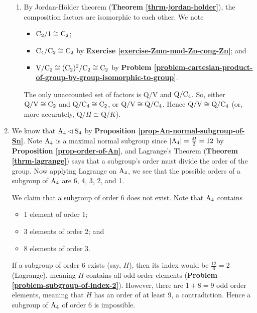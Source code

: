 \begin{enumerate}
\begin{enumerate}[label=(\roman*)]
        \item By Jordan-H\"older theorem (\textbf{Theorem \ref{thrm-jordan-holder}}), the composition factors are isomorphic to each other. We note
        \begin{itemize}
            \item $\mathrm{C}_{2} / 1 \cong \mathrm{C}_{2}$;
            \item $\mathrm{C}_{4} / \mathrm{C}_{2} \cong \mathrm{C}_{2}$ by \textbf{Exercise \ref{exercise-Zmn-mod-Zn-cong-Zn}}; and
            \item $\mathrm{V} / \mathrm{C}_{2} \cong (\mathrm{C}_{2})^2 / \mathrm{C}_{2} \cong \mathrm{C}_{2}$ by \textbf{Problem \ref{problem-cartesian-product-of-group-by-group-isomorphic-to-group}}.
        \end{itemize}
        The only unaccounted set of factors is $\mathrm{Q}/\mathrm{V}$ and $\mathrm{Q}/\mathrm{C}_{4}$. So, either $\mathrm{Q}/\mathrm{V} \cong \mathrm{C}_{2}$ and $\mathrm{Q}/\mathrm{C}_{4} \cong \mathrm{C}_{2}$, or $\mathrm{Q}/\mathrm{V} \cong \mathrm{Q}/\mathrm{C}_{4}$. Hence $\mathrm{Q}/\mathrm{V} \cong \mathrm{Q}/\mathrm{C}_{4}$ (or, more accurately, $\mathrm{Q}/H \cong \mathrm{Q}/K$).
    \end{enumerate}
    
    \item We know that $\mathrm{A}_{4} \lhd \mathrm{S}_{4}$ by \textbf{Proposition \ref{prop-An-normal-subgroup-of-Sn}}. Note $\mathrm{A}_{4}$ is a maximal normal subgroup since $|\mathrm{A}_{4}| = \frac{4!}2 = 12$ by \textbf{Proposition \ref{prop-order-of-An}}, and Lagrange's Theorem (\textbf{Theorem \ref{thrm-lagrange}}) says that a subgroup's order must divide the order of the group. Now applying Lagrange on $\mathrm{A}_{4}$, we see that the possible orders of a subgroup of $\mathrm{A}_{4}$ are 6, 4, 3, 2, and 1.
    
    We claim that a subgroup of order 6 does not exist. Note that $\mathrm{A}_{4}$ contains
    \begin{itemize}
        \item 1 element of order 1;
        \item 3 elements of order 2; and
        \item 8 elements of order 3.
    \end{itemize}
    If a subgroup of order 6 exists (say, $H$), then its index would be $\frac{12}{6} = 2$ (Lagrange), meaning $H$ contains all odd order elements (\textbf{Problem \ref{problem-subgroup-of-index-2}}). However, there are $1 + 8 = 9$ odd order elements, meaning that $H$ has an order of at least 9, a contradiction. Hence a subgroup of $\mathrm{A}_{4}$ of order 6 is impossible.
    

\end{enumerate}

